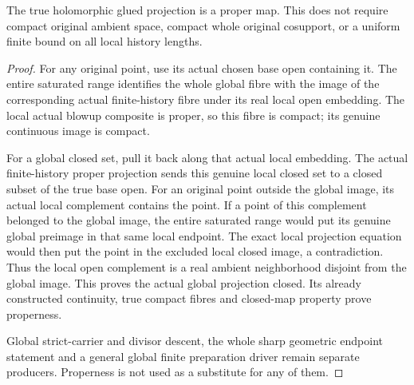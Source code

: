 \begin{theorem}
\label{hir:sharp-actual-original-global-projection-proper}
\leanok
{}
The true holomorphic glued projection is a proper map. This does not require
compact original ambient space, compact whole original cosupport, or a
uniform finite bound on all local history lengths.
\end{theorem}
\begin{proof}
For any original point, use its actual chosen base open containing it. The
entire saturated range identifies the whole global fibre with the image of
the corresponding actual finite-history fibre under its real local open
embedding. The local actual blowup composite is proper, so this fibre is
compact; its genuine continuous image is compact.

For a global closed set, pull it back along that actual local embedding.
The actual finite-history proper projection sends this genuine local closed
set to a closed subset of the true base open. For an original point outside
the global image, its actual local complement contains the point. If a point
of this complement belonged to the global image, the entire saturated range
would put its genuine global preimage in that same local endpoint. The exact
local projection equation would then put the point in the excluded local
closed image, a contradiction. Thus the local open complement is a real
ambient neighborhood disjoint from the global image. This proves the actual
global projection closed. Its already constructed continuity, true compact
fibres and closed-map property prove properness.

Global strict-carrier and divisor descent, the whole sharp geometric endpoint
statement and a general global finite preparation driver remain separate
producers. Properness is not used as a substitute for any of them.
\end{proof}
